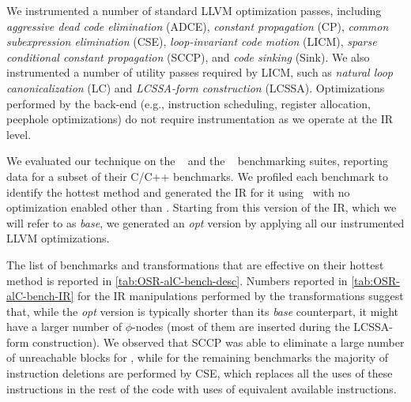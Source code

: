 \noindent We instrumented a number of standard LLVM optimization passes, including {\em aggressive dead code elimination} (ADCE), {\em constant propagation} (CP), {\em common subexpression elimination} (CSE), {\em loop-invariant code motion} (LICM), {\em sparse conditional constant propagation} (SCCP), and {\em code sinking} (Sink). We also instrumented a number of utility passes required by LICM, such as {\em natural loop canonicalization} (LC) and {\em LCSSA-form construction} (LCSSA). Optimizations performed by the back-end (e.g., instruction scheduling, register allocation, peephole optimizations) do not require instrumentation as we operate at the IR level.

We evaluated our technique on the \speccpu~\cite{Henning06} and the \phoronixpts~\cite{Phoronix} benchmarking suites, reporting data for a subset of their C/C++ benchmarks. We profiled each benchmark to identify the hottest method and generated the IR for it using \clang\ with no optimization enabled other than \memtoreg. Starting from this version of the IR, which we will refer to as {\em base}, we generated an {\em opt} version by applying all our instrumented LLVM optimizations.

The list of benchmarks and transformations that are effective on their hottest method is reported in \mytable\ref{tab:OSR-alC-bench-desc}. Numbers reported in \mytable\ref{tab:OSR-alC-bench-IR} for the IR manipulations performed by the transformations suggest that, while the {\em opt} version is typically shorter than its {\em base} counterpart, it might have a larger number of $\phi$-nodes (most of them are inserted during the LCSSA-form construction). We observed that SCCP was able to eliminate a large number of unreachable blocks for , while for the remaining benchmarks the majority of instruction deletions are performed by CSE, which replaces all the uses of these instructions in the rest of the code with uses of equivalent available instructions.


